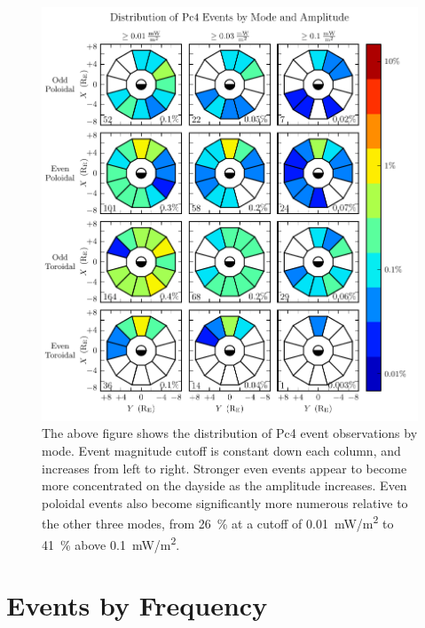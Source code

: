 \begin{figure}[!htb]
  \centering
  \includegraphics[width=\textwidth]{figures/mode_amp.pdf}
  \caption[Rate of Pc4 Events by Mode and Amplitude]{
    The above figure shows the distribution of Pc4 event observations by mode.
    Event magnitude cutoff is constant down each column, and increases from
    left to right. Stronger even events appear to become more concentrated on
    the dayside as the amplitude increases. Even poloidal events also become
    significantly more numerous relative to the other three modes, from
    \SI{26}{\percent} at a cutoff of \SI{0.01}{\mW/\m\squared} to
    \SI{41}{\percent} above \SI{0.1}{\mW/\m\squared}. 
  }
  \label{fig_mode_amp}
\end{figure}

\section{Events by Frequency}
  \label{sec_f}

